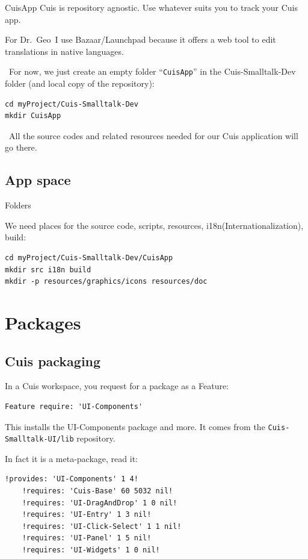 \documentclass{beamer}
\newcommand{\tip}{\boldmath{\textcolor{red}{$\Rightarrow$}}}
\newcommand{\drgeo}{Dr.~Geo}
\begin{document}
\begin{frame}[fragile]{CuisApp}
  Cuis is repository agnostic. Use whatever suits you to track your
  Cuis app.

  For \drgeo\ I use Bazaar/Launchpad because it offers a web tool to
  edit translations in native languages\cite{drgeoRepo}.

  \tip\ For now, we just create an empty folder ``\texttt{CuisApp}''
  in the Cuis-Smalltalk-Dev folder (and local copy of the repository):

\begin{verbatim}
cd myProject/Cuis-Smalltalk-Dev
mkdir CuisApp
\end{verbatim}

  \tip\ All the source codes and related resources needed for our Cuis
  application will go there.
  
\end{frame}

\subsection{App space}
%
\begin{frame}[fragile]{Folders}

  We need places for the source code, scripts, resources,
  i18n(Internationalization), build:
\begin{verbatim}
cd myProject/Cuis-Smalltalk-Dev/CuisApp
mkdir src i18n build
mkdir -p resources/graphics/icons resources/doc
\end{verbatim}  
\end{frame}
%
\section{Packages}
\subsection{Cuis packaging}
\begin{frame}[fragile]
  In a Cuis workspace, you request for a package as a Feature:
  \begin{lstlisting}[language=Smalltalk]
    Feature require: 'UI-Components'
  \end{lstlisting}
  This installs the UI-Components package and more. It comes from the
  \texttt{Cuis-Smalltalk-UI/lib} repository.

  \vspace*{10pt}
  In fact it is a meta-package, read it:
  \fontsize{10pt}{8pt}\selectfont
  \begin{lstlisting}[language=Smalltalk]
    !provides: 'UI-Components' 1 4!
    !requires: 'Cuis-Base' 60 5032 nil!
    !requires: 'UI-DragAndDrop' 1 0 nil!
    !requires: 'UI-Entry' 1 3 nil!
    !requires: 'UI-Click-Select' 1 1 nil!
    !requires: 'UI-Panel' 1 5 nil!
    !requires: 'UI-Widgets' 1 0 nil!
  \end{lstlisting}
\end{frame}
\end{document}
